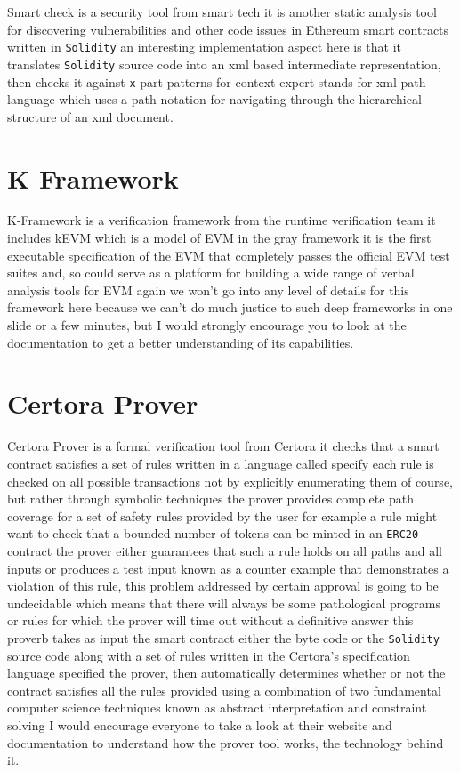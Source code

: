 Smart check is a security tool from smart tech it is another static analysis tool for discovering vulnerabilities and other code issues in Ethereum smart contracts written in \verb|Solidity| an interesting implementation aspect here is that it translates \verb|Solidity| source code into an xml based intermediate representation, then checks it against \verb|x| part patterns for context expert stands for xml path language which uses a path notation for navigating through the hierarchical structure of an xml document.

\section{K Framework}

K-Framework is a verification framework from the runtime verification team it includes kEVM which is a model of EVM in the gray framework it is the first executable specification of the EVM that completely passes the official EVM test suites and, so could serve as a platform for building a wide range of verbal analysis tools for EVM again we won't go into any level of details for this framework here because we can't do much justice to such deep frameworks in one slide or a few minutes, but I would strongly encourage you to look at the documentation to get a better understanding of its capabilities.

\section{Certora Prover}

Certora Prover is a formal verification tool from Certora it checks that a smart contract satisfies a set of rules written in a language called specify each rule is checked on all possible transactions not by explicitly enumerating them of course, but rather through symbolic techniques the prover provides complete path coverage for a set of safety rules provided by the user for example a rule might want to check that a bounded number of tokens can be minted in an \verb|ERC20| contract the prover either guarantees that such a rule holds on all paths and all inputs or produces a test input known as a counter example that demonstrates a violation of this rule, this problem addressed by certain approval is going to be undecidable which means that there will always be some pathological programs or rules for which the prover will time out without a definitive answer this proverb takes as input the smart contract either the byte code or the \verb|Solidity| source code along with a set of rules written in the Certora's specification language specified the prover, then automatically determines whether or not the contract satisfies all the rules provided using a combination of two fundamental computer science techniques known as abstract interpretation and constraint solving I would encourage everyone to take a look at their website and documentation to understand how the prover tool works, the technology behind it.


